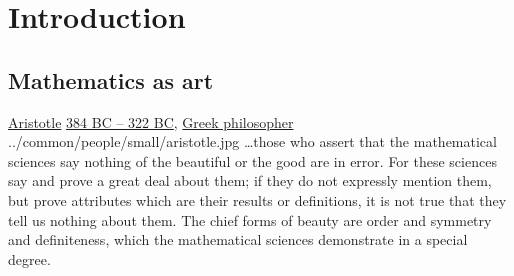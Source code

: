 ﻿%

\chapter{Introduction}

\section*{Mathematics as art}
\qboxnps
  {\href{http://en.wikipedia.org/wiki/Aristotle}{Aristotle}
   \href{http://www-history.mcs.st-andrews.ac.uk/Timelines/TimelineA.html}{384 BC -- 322 BC},
   \href{http://www-history.mcs.st-andrews.ac.uk/BirthplaceMaps/Places/Greece.html}{Greek philosopher}
   \footnotemark
  }
  {../common/people/small/aristotle.jpg}
  {\ldots those who assert that the mathematical sciences
     say nothing of the beautiful or the good are in error.
     For these sciences say and prove a great deal about them;
     if they do not expressly mention them, but prove attributes
     which are their results or definitions, it is not true that they tell
     us nothing about them.
     The chief forms of beauty are order and symmetry and definiteness,
     which the mathematical sciences demonstrate in a special degree.}

